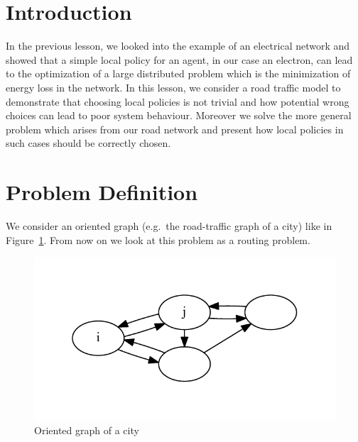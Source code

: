 

\newcommand{\x}{\mathbf{x}}
\newcommand{\y}{\mathbf{y}}
\newcommand{\z}{\mathbf{z}}
\newcommand{\blambda}{\boldsymbol{\lambda}}
\newcommand{\bmu}{\boldsymbol{\nu}}
\usepackage{color}



\section{Introduction}

In the previous lesson, we looked into the example of an electrical network and showed that a simple local policy for an agent, in our case an electron, can lead to the optimization of a large distributed problem which is the minimization of energy loss in the  network. In this lesson, we consider a road traffic model to demonstrate that choosing local policies is not trivial and how potential wrong choices can lead to poor system behaviour. Moreover we solve the more general problem which arises from our road network and present how local policies in such cases should be correctly chosen.

\section{Problem Definition}
We consider an oriented graph (e.g.\ the road-traffic graph of a city) like in Figure~\ref{fig:1}. From now on we look at this problem as a routing problem.
\begin{figure}[h!]
\centering
\includegraphics[scale=.7]{fig1.pdf}
\caption{Oriented graph of a city}
\label{fig:1}
\end{figure}

